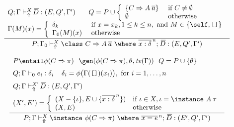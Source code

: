 \begin{figure}
\begin{mdframed}
\[ \begin{array}{cc}
	\displaystyle\frac
	 {\begin{array}{ll}
            Q;\Gamma \vdash_{\Uparrow}^X \overline{\!D} : (E, Q', \Gamma') \:\: & \:\:
            Q = P \cup \left\{ \begin{array}{ll}
                                  \{ C \Rightarrow A\:\overline{a} \} & \text{ if } C \not= \emptyset \\
                                  \emptyset                              & \text{ otherwise}
                                \end{array}\right. \\
            \multicolumn{2}{c}{
                \Gamma(M)(x) = \left\{ \begin{array}{ll}
                                 \delta_k       & \text{ if } x = x_k, 1 \leq k \leq n, \text{ and } 
                                                              M \in \{ \self, \texttt{[]} \}\\
                                 \Gamma_0(M)(x) & \text{ otherwise} 
                               \end{array}\right. }
          \end{array}}
	 {P;\Gamma_0 \vdash_{\Uparrow}^X \class\ C \Rightarrow A\: \overline{a}\ \where\ \overline{x:\delta}^{\,n};\: \overline{\!D} : 
            (E, Q', \Gamma') } \\\ \\

	\displaystyle\frac
	 {\begin{array}{l}
               P \entail \phi(C \Rightarrow \pi) \:\:\:
               \gen(\phi(C\Rightarrow \pi), \theta, \tv(\Gamma)) \:\:\:
               Q = P \cup \{ \theta \} \:\:\: \\[.2cm]
               Q;\Gamma \vdash_0 e_i : \delta_i \:\:\:\:\: 
               \delta_i = \phi\bigl(\Gamma(\texttt{[]})(x_i)\bigr), \text{ for } i=1,\ldots, n\\[.2cm]
               Q;\Gamma \vdash_{\Uparrow}^{X'} \overline{\!D} : (E,Q',\Gamma') \\[.2cm]
               (X',E') = \left\{ \begin{array}{ll}
                               (X - \{ \iota \}, E \cup \{ \overline{x : \delta}^{\,n} \}) 
                                   & \text{if } \iota \in X, \iota = \instance\ A\: \tau \\
                               (X, E) & \text{otherwise} 
                             \end{array}\right.
          \end{array}}
	 {P;\Gamma \vdash_{\Uparrow}^X \instance\ \phi(C \Rightarrow \pi)\ \where\ \overline{x = e}^{\,n};\: \overline{\!D}
             : (E',Q',\Gamma')}\\\ \\


\end{array}\]
\end{mdframed}
\end{figure}
